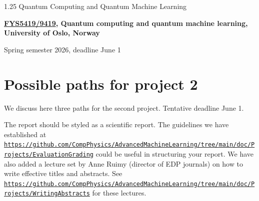 \documentclass[%
oneside,                 %
final,                   %
10pt]{article}
\begin{document}

\newcommand{\exercisesection}[1]{\subsection*{#1}}






\thispagestyle{empty}

\begin{center}
{\LARGE\bf
\begin{spacing}{1.25}
Quantum Computing and Quantum Machine Learning
\end{spacing}
}
\end{center}


\begin{center}
{\bf \href{{https://www.uio.no/studier/emner/matnat/fys/FYS5419/index-eng.html}}{FYS5419/9419}, Quantum computing and quantum machine learning, University of Oslo, Norway${}^{}$} \\ [0mm]
\end{center}

\begin{center}
\end{center}
    

\begin{center}
Spring semester 2026, deadline June 1
\end{center}

\vspace{1cm}
\tableofcontents
\newpage

\section*{Possible paths for project 2}

We discuss here three paths for the second project.
Tentative deadline June 1.

The report should be styled as a scientific report. The guidelines
we have established at
\href{{https://github.com/CompPhysics/AdvancedMachineLearning/tree/main/doc/Projects/EvaluationGrading}}{\nolinkurl{https://github.com/CompPhysics/AdvancedMachineLearning/tree/main/doc/Projects/EvaluationGrading}}
could be useful in structuring your report. We have also added a
lecture set by Anne Ruimy (director of EDP journals) on how to write
effective titles and abstracts. See
\href{{https://github.com/CompPhysics/AdvancedMachineLearning/tree/main/doc/Projects/WritingAbstracts}}{\nolinkurl{https://github.com/CompPhysics/AdvancedMachineLearning/tree/main/doc/Projects/WritingAbstracts}}
for these lectures.
\end{document}
